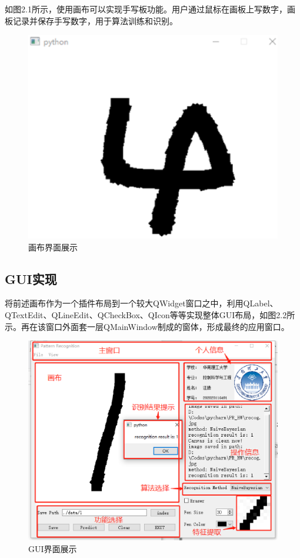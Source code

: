 \documentclass[UTF8, a4paper, 12pt]{report}
\begin{document}
			如图2.1所示，使用画布可以实现手写板功能。用户通过鼠标在画板上写数字，画板记录并保存手写数字，用于算法训练和识别。
			\begin{figure}[H]
			\centering
			\includegraphics[scale=0.5]{./img/PaintBoard.eps}
			\caption{画布界面展示}
			\label{fig:2.1}
			\end{figure}

		\subsection{GUI实现}
			将前述画布作为一个插件布局到一个较大QWidget窗口之中，利用QLabel、QTextEdit、QLineEdit、QCheckBox、QIcon等等实现整体GUI布局，如图2.2所示。再在该窗口外面套一层QMainWindow制成的窗体，形成最终的应用窗口。
			\begin{figure}[H]
			\centering
			\includegraphics[scale=0.5]{./img/GUI.eps}
			\caption{GUI界面展示}
			\label{fig:2.2}
			\end{figure}	
\clearpage
\end{document}
